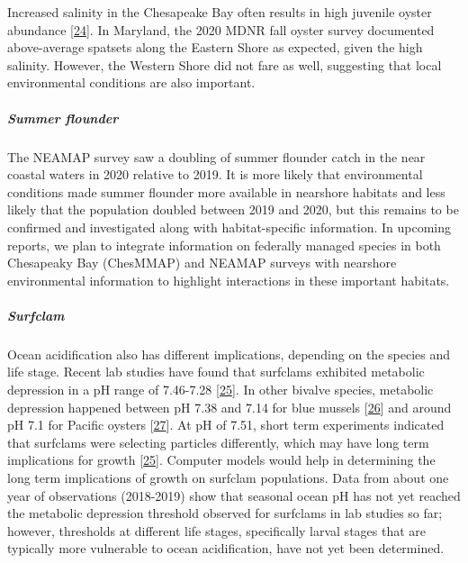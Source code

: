 \documentclass[
  10pt,
]{article}
\begin{document}
Increased salinity in the Chesapeake Bay often results in high juvenile
oyster abundance
{[}\protect\hyperlink{ref-kimmel_relationship_2014}{24}{]}. In Maryland,
the 2020 MDNR fall oyster survey documented above-average spatsets along
the Eastern Shore as expected, given the high salinity. However, the
Western Shore did not fare as well, suggesting that local environmental
conditions are also important.

\hypertarget{summer-flounder}{%
\subparagraph{\texorpdfstring{\emph{Summer
flounder}}{Summer flounder}}\label{summer-flounder}}

The NEAMAP survey saw a doubling of summer flounder catch in the near
coastal waters in 2020 relative to 2019. It is more likely that
environmental conditions made summer flounder more available in
nearshore habitats and less likely that the population doubled between
2019 and 2020, but this remains to be confirmed and investigated along
with habitat-specific information. In upcoming reports, we plan to
integrate information on federally managed species in both Chesapeaky
Bay (ChesMMAP) and NEAMAP surveys with nearshore environmental
information to highlight interactions in these important habitats.

\hypertarget{surfclam}{%
\subparagraph{\texorpdfstring{\emph{Surfclam}}{Surfclam}}\label{surfclam}}

Ocean acidification also has different implications, depending on the
species and life stage. Recent lab studies have found that surfclams
exhibited metabolic depression in a pH range of 7.46-7.28
{[}\protect\hyperlink{ref-pousse_energetic_2020}{25}{]}. In other
bivalve species, metabolic depression happened between pH 7.38 and 7.14
for blue mussels {[}\protect\hyperlink{ref-thomsen_moderate_2010}{26}{]}
and around pH 7.1 for Pacific oysters
{[}\protect\hyperlink{ref-lannig_impact_2010}{27}{]}. At pH of 7.51,
short term experiments indicated that surfclams were selecting particles
differently, which may have long term implications for growth
{[}\protect\hyperlink{ref-pousse_energetic_2020}{25}{]}. Computer models
would help in determining the long term implications of growth on
surfclam populations. Data from about one year of observations
(2018-2019) show that seasonal ocean pH has not yet reached the
metabolic depression threshold observed for surfclams in lab studies so
far; however, thresholds at different life stages, specifically larval
stages that are typically more vulnerable to ocean acidification, have
not yet been determined.
\end{document}
